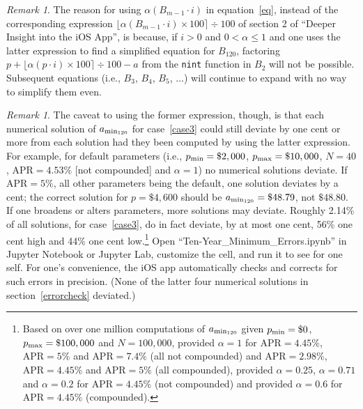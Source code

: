 \documentclass[12pt,letterpaper,oneside]{article}
\theoremstyle{remark} %
\newtheorem{remark}[theorem]{Remark}
\begin{document}
	\newpage
	\begin{remark}
	The reason for using $\alpha\left(B_{m-1}\cdot i\right)$ in equation~\ref{eq}, instead of the corresponding expression $\big\lfloor{\alpha\left(B_{m-1}\cdot i\right)\times 100}\big\rceil\div 100$ of section 2 of ``Deeper Insight into the iOS App'', is because, if $i>0$ and $0<\alpha\leq1$ and one uses the latter expression to find a simplified equation for $B_{120}$, factoring $p+\big\lfloor{\alpha\left(p\cdot i\right)\times 100}\big\rceil\div 100-a$ from the \texttt{nint} function in $B_{2}$ will not be possible. Subsequent equations (i.e., $B_{3}$, $B_{4}$, $B_{5}$, $\dots$) will continue to expand with no way to simplify them even.
	\end{remark}
	
	\vspace{12pt}
	\begin{remark} The caveat to using the former expression, though, is that each numerical solution of $a_{\rm{min_{120}}}$ for case~\ref{case3} could still deviate by one cent or more from each solution had they been computed by using the latter expression. For example, for default parameters (i.e., $p_{\rm{min}}=\$2,000$, $p_{\rm{max}}=\$10,000$, $N=40$, $\mbox{APR}=4.53\%$ [not compounded] and $\alpha =1$) no numerical solutions deviate. If $\mbox{APR}=5\%$, all other parameters being the default, one solution deviates by a cent; the correct solution for $p=\$4,600$ should be $a_{\rm{min_{120}}}=\$48.79$, not $\$48.80$. If one broadens or alters parameters, more solutions may deviate. Roughly 2.14\% of all solutions, for case~\ref{case3}, do in fact deviate, by at most one cent, 56\% one cent high and 44\% one cent low.\footnote{Based on over one million computations of $a_{\rm{min_{120}}}$ given $p_{\rm{min}}=\$0$, $p_{\rm{max}}=\$100,000$ and $N=100,000$, provided $\alpha =1$ for $\mbox{APR}=4.45\%$, $\mbox{APR}=5\%$ and $\mbox{APR}=7.4\%$ (all not compounded) and $\mbox{APR}=2.98\%$, $\mbox{APR}=4.45\%$ and $\mbox{APR}=5\%$ (all compounded), provided $\alpha =0.25$, $\alpha =0.71$ and $\alpha =0.2$ for $\mbox{APR}=4.45\%$ (not compounded) and provided $\alpha =0.6$ for $\mbox{APR}=4.45\%$ (compounded).} Open ``Ten-Year\_Minimum\_Errors.ipynb'' in Jupyter Notebook or Jupyter Lab, customize the cell, and run it to see for one self. For one's convenience, the iOS app automatically checks and corrects for such errors in precision. (None of the latter four numerical solutions in section~\ref{errorcheck} deviated.)
	\end{remark}	
\end{document}
